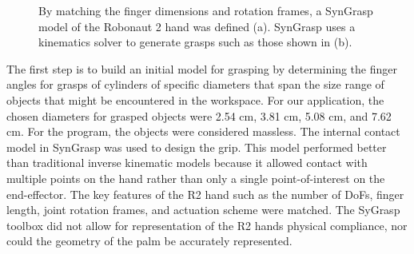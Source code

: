 \documentclass[runningheads,a4paper]{llncs}
\begin{document}
\begin{figure}[t]%
\centering
\null\hfill
	\hfill
	\hfill\null

\caption{By matching the finger dimensions and rotation frames, a SynGrasp model of the Robonaut 2 hand was defined (a).  SynGrasp uses a kinematics solver to generate grasps such as those shown in (b). }%
\label{fig:models}%
\end{figure} 

The first step is to build an initial model for grasping by determining the finger angles for grasps of cylinders of specific diameters that span the size range of objects that might be encountered in the workspace.  For our application, the chosen diameters for grasped objects were 2.54 cm, 3.81 cm, 5.08 cm, and 7.62 cm.  For the program, the objects were considered massless.  The internal contact model in SynGrasp was used to design the grip.  This model performed better than traditional inverse kinematic models because it allowed contact with multiple points on the hand rather than only a single point-of-interest on the end-effector.  The key features of the R2 hand such as the number of DoFs, finger length, joint rotation frames, and actuation scheme were matched.  The SyGrasp toolbox did not allow for representation of the R2 hands physical compliance, nor could the geometry of the palm be accurately represented. 
\end{document}
